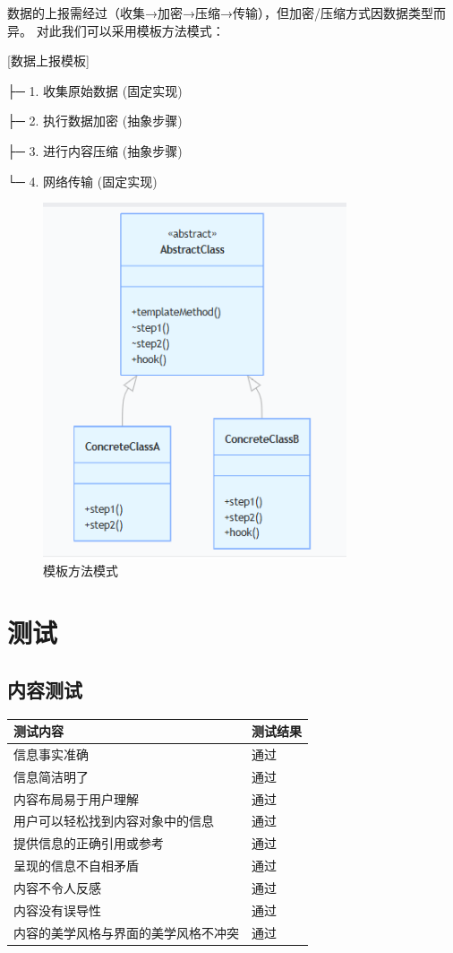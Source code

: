 \documentclass[12pt]{ctexart} %
\begin{document}
数据的上报需经过（收集→加密→压缩→传输），但加密/压缩方式因数据类型而异。
对此我们可以采用模板方法模式：

[数据上报模板]

├─ 1. 收集原始数据 (固定实现)

├─ 2. 执行数据加密 (抽象步骤)

├─ 3. 进行内容压缩 (抽象步骤)

└─ 4. 网络传输 (固定实现)

\begin{figure}[H]
  \centering
  \includegraphics[width=0.8\textwidth]{moshi.png}
  \caption{模板方法模式}
\end{figure}
\section{测试}
\subsection{内容测试}
\begin{table}[H]
\centering
\renewcommand{\arraystretch}{1.5} 
\large
\begin{tabular}{|>{\centering\arraybackslash}m{10cm}|>{\centering\arraybackslash}m{3cm}|}
\hline
\textbf{测试内容} & \textbf{测试结果} \\
\hline
信息事实准确 & 通过 \\
\hline
信息简洁明了 & 通过 \\
\hline
内容布局易于用户理解 & 通过 \\
\hline
用户可以轻松找到内容对象中的信息 & 通过 \\
\hline
提供信息的正确引用或参考 & 通过 \\
\hline
呈现的信息不自相矛盾 & 通过 \\
\hline
内容不令人反感 & 通过 \\
\hline
内容没有误导性 & 通过 \\
\hline
内容的美学风格与界面的美学风格不冲突 & 通过 \\
\hline
\end{tabular}
\label{tab:test_results}
\end{table}
\end{document}
